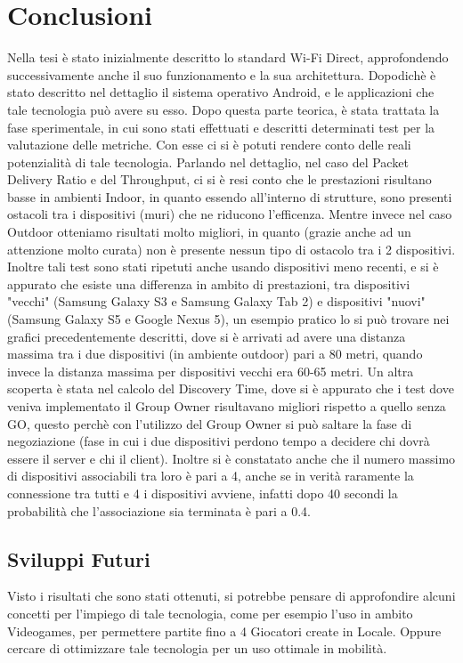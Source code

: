 \chapter{Conclusioni}
Nella tesi è stato inizialmente descritto lo standard Wi-Fi Direct, approfondendo successivamente anche il suo funzionamento e la sua architettura.
Dopodichè è stato descritto nel dettaglio il sistema operativo Android, e le applicazioni che tale tecnologia può avere su esso.
Dopo questa parte teorica, è stata trattata la fase sperimentale, in cui sono stati effettuati e descritti determinati test per la valutazione delle metriche.
Con esse ci si è potuti rendere conto delle reali potenzialità di tale tecnologia.
Parlando nel dettaglio, nel caso del Packet Delivery Ratio e del Throughput, ci si è resi conto che le prestazioni risultano basse in ambienti Indoor, in quanto essendo all'interno di strutture, sono presenti ostacoli tra i dispositivi (muri) che ne riducono l'efficenza.
Mentre invece nel caso Outdoor otteniamo risultati molto migliori, in quanto (grazie anche ad un attenzione molto curata) non è presente nessun tipo di ostacolo tra i 2 dispositivi.
Inoltre tali test sono stati ripetuti anche usando dispositivi meno recenti, e si è appurato che esiste una differenza in ambito di prestazioni, tra dispositivi "vecchi" (Samsung Galaxy S3 e Samsung Galaxy Tab 2) e dispositivi "nuovi" (Samsung Galaxy S5 e Google Nexus 5), un esempio pratico lo si può trovare nei grafici precedentemente descritti, dove si è arrivati ad avere una distanza massima tra i due dispositivi (in ambiente outdoor) pari a 80 metri, quando invece la distanza massima per dispositivi vecchi era 60-65 metri.
Un altra scoperta è stata nel calcolo del Discovery Time, dove si è appurato che i test dove veniva implementato il Group Owner risultavano migliori rispetto a quello senza GO, questo perchè con l'utilizzo del Group Owner si può saltare la fase di negoziazione (fase in cui i due dispositivi perdono tempo a decidere chi dovrà essere il server e chi il client).
Inoltre si è constatato anche che il numero massimo di dispositivi associabili tra loro è pari a 4, anche se in verità raramente la connessione tra tutti e 4 i dispositivi avviene, infatti dopo 40 secondi la probabilità che l'associazione sia terminata è pari a 0.4.

\section{Sviluppi Futuri}

Visto i risultati che sono stati ottenuti, si potrebbe pensare di approfondire alcuni concetti per l'impiego di tale tecnologia, come per esempio l'uso in ambito Videogames, per permettere partite fino a 4 Giocatori create in Locale.
Oppure cercare di ottimizzare tale tecnologia per un uso ottimale in mobilità.

\clearpage{\pagestyle{empty}\cleardoublepage}